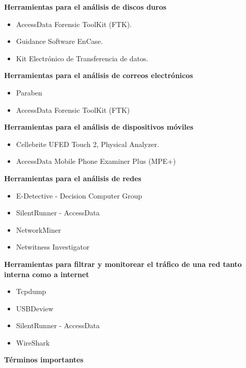 \noindent \textbf{Herramientas para el análisis de discos duros}

\begin{itemize}
    \item AccessData Forensic ToolKit (FTK).
    \item Guidance Software EnCase.
    \item Kit Electrónico de Transferencia de datos.
\end{itemize}

\noindent \textbf{Herramientas para el análisis de correos electrónicos}

\begin{itemize}
    \item Paraben
    \item AccessData Forensic ToolKit (FTK)
\end{itemize}

\noindent \textbf{Herramientas para el análisis de dispositivos móviles}

\begin{itemize}
    \item Cellebrite UFED Touch 2, Physical Analyzer.
    \item AccessData Mobile Phone Examiner Plus (MPE+)
\end{itemize}

\noindent \textbf{Herramientas para el análisis de redes}

\begin{itemize}
    \item E-Detective - Decision Computer Group
    \item SilentRunner - AccessData
    \item NetworkMiner
    \item Netwitness Investigator
\end{itemize}

\noindent \textbf{Herramientas para filtrar y monitorear el tráfico de una red tanto interna como a internet}

\begin{itemize}
    \item Tcpdump
    \item USBDeview
    \item SilentRunner - AccessData
    \item WireShark
\end{itemize}

\noindent \textbf{Términos importantes}

